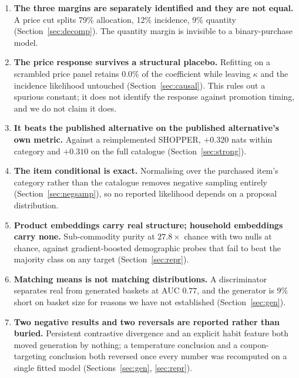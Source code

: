 \documentclass[11pt]{article}
\begin{document}
\begin{enumerate}
\item \textbf{The three margins are separately identified and they are not equal.} A price
cut splits 79\% allocation, 12\% incidence, 9\% quantity (Section~\ref{sec:decomp}). The
quantity margin is invisible to a binary-purchase model.

\item \textbf{The price response survives a structural placebo.} Refitting on a scrambled
price panel retains 0.0\% of the coefficient while leaving $\kappa$ and the incidence
likelihood untouched (Section~\ref{sec:causal}). This rules out a spurious constant; it does
not identify the response against promotion timing, and we do not claim it does.

\item \textbf{It beats the published alternative on the published alternative's own
metric.} Against a reimplemented SHOPPER, $+0.320$ nats within category and $+0.310$ on the
full catalogue (Section~\ref{sec:strong}).

\item \textbf{The item conditional is exact.} Normalising over the purchased item's category
rather than the catalogue removes negative sampling entirely (Section~\ref{sec:negsamp}), so
no reported likelihood depends on a proposal distribution.

\item \textbf{Product embeddings carry real structure; household embeddings carry none.}
Sub-commodity purity at $27.8\times$ chance with two nulls at chance, against
gradient-boosted demographic probes that fail to beat the majority class on any target
(Section~\ref{sec:repr}).

\item \textbf{Matching means is not matching distributions.} A discriminator separates real
from generated baskets at AUC $0.77$, and the generator is 9\% short on basket size for
reasons we have not established (Section~\ref{sec:gen}).

\item \textbf{Two negative results and two reversals are reported rather than buried.}
Persistent contrastive divergence and an explicit habit feature both moved generation by
nothing; a temperature conclusion and a coupon-targeting conclusion both reversed once every
number was recomputed on a single fitted model (Sections~\ref{sec:gen}, \ref{sec:repr}).
\end{enumerate}
\end{document}
